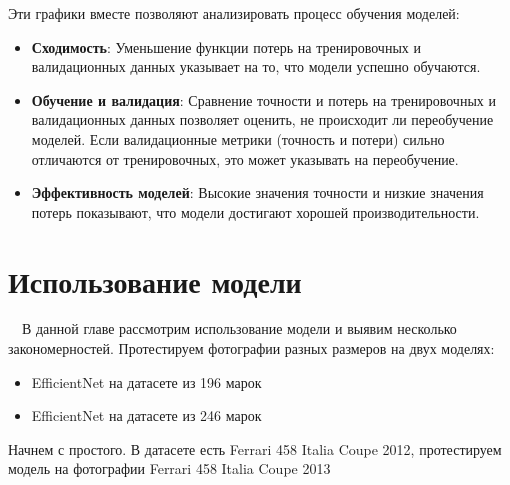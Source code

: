 \documentclass[14pt]{extarticle}
\begin{document}
Эти графики вместе позволяют анализировать процесс обучения моделей:
\begin{itemize}
    \item \textbf{Сходимость}: Уменьшение функции потерь на тренировочных и валидационных данных указывает на то, что модели успешно обучаются.
    \item \textbf{Обучение и валидация}: Сравнение точности и потерь на тренировочных и валидационных данных позволяет оценить, не происходит ли переобучение моделей. Если валидационные метрики (точность и потери) сильно отличаются от тренировочных, это может указывать на переобучение.
    \item \textbf{Эффективность моделей}: Высокие значения точности и низкие значения потерь показывают, что модели достигают хорошей производительности.
\end{itemize}

\section[Использование модели]{\textbf{Использование модели}}
\ \ В данной главе рассмотрим использование модели и выявим несколько закономерностей. Протестируем фотографии разных
размеров на двух моделях:
\begin{itemize}
    \item  \foreignlanguage{english}{EfficientNet} на датасете из 196 марок 
    \item  \foreignlanguage{english}{EfficientNet} на датасете из 246 марок 
\end{itemize}

Начнем с простого. В датасете есть Ferrari 458 Italia Coupe 2012, протестируем модель на фотографии Ferrari 458 Italia Coupe 2013 
\end{document}
